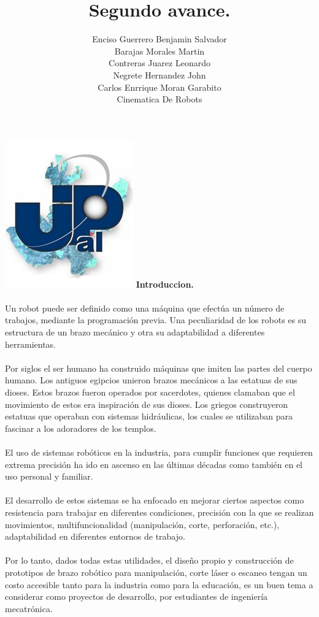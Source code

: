 \documentclass[12pt,a4paper]{article}
\author{Enciso Guerrero Benjamin Salvador\\
Barajas Morales Martin\\
Contreras Juarez Leonardo\\
Negrete Hernandez John\\
Carlos Enrrique Moran Garabito\\
Cinematica De Robots }
\title{Segundo avance.}
\begin{document}
\maketitle
\includegraphics[scale=1.8]{upzmgg.jpg} 
\newpage
\textbf{Introduccion.}
\\\\
Un robot puede ser definido como una máquina que efectúa un número de trabajos, mediante la programación previa. Una peculiaridad de los robots es su estructura de un brazo mecánico y otra su adaptabilidad a diferentes herramientas.
\\\\
Por siglos el ser humano ha construido máquinas que imiten las partes del cuerpo humano. Los antiguos egipcios unieron brazos mecánicos a las estatuas de sus dioses. Estos brazos fueron operados por sacerdotes, quienes clamaban que el movimiento de estos era inspiración de sus dioses. Los griegos construyeron estatuas que operaban con sistemas hidráulicas, los cuales se utilizaban para fascinar a los adoradores de los templos.
\\\\
El uso de sistemas robóticos en la industria, para cumplir funciones que requieren extrema precisión ha ido en ascenso en las últimas décadas como también en el uso personal y familiar.
\\\\
El desarrollo de estos sistemas se ha enfocado en mejorar ciertos aspectos como resistencia para trabajar en diferentes condiciones, precisión con la que se realizan movimientos, multifuncionalidad (manipulación, corte, perforación, etc.), adaptabilidad en diferentes entornos de trabajo.
\\\\
Por lo tanto, dados todas estas utilidades, el diseño propio y construcción de prototipos de brazo robótico para manipulación, corte láser o escaneo tengan un costo accesible tanto para la industria como para la educación, es un buen tema a considerar como proyectos de desarrollo, por estudiantes de ingeniería mecatrónica.
\end{document}
